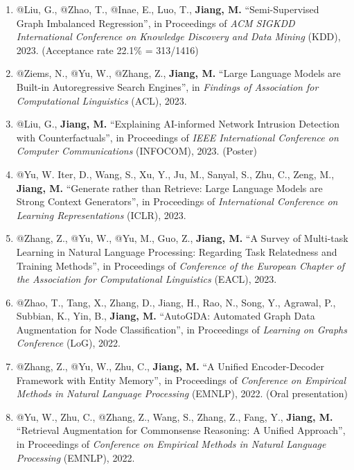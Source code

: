 \documentclass[10pt]{article}
\newenvironment{myindentpar}[1]%
{\begin{list}{}%
         {\setlength{\leftmargin}{#1}}%
         \item[]%
}
{\end{list}}
\newcounter{list}
\begin{document}
\begin{myindentpar}{0.00cm}
\begin{enumerate}[leftmargin=.5cm]
\item[C78] @Liu, G., @Zhao, T., @Inae, E., Luo, T., \textbf{Jiang, M.} ``Semi-Supervised Graph Imbalanced Regression'', in Proceedings of \textit{ACM SIGKDD International Conference on Knowledge Discovery and Data Mining} (KDD), 2023. (Acceptance rate 22.1\% = 313/1416)
		
\item[C77] @Ziems, N., @Yu, W., @Zhang, Z., \textbf{Jiang, M.} ``Large Language Models are Built-in Autoregressive Search Engines'', in \textit{Findings of Association for Computational Linguistics} (ACL), 2023.

\item[C76] @Liu, G., \textbf{Jiang, M.} ``Explaining AI-informed Network Intrusion Detection with Counterfactuals'', in Proceedings of \textit{IEEE International Conference on Computer Communications} (INFOCOM), 2023. (Poster)
		
\item[C75] @Yu, W. Iter, D., Wang, S., Xu, Y., Ju, M., Sanyal, S., Zhu, C., Zeng, M., \textbf{Jiang, M.} ``Generate rather than Retrieve: Large Language Models are Strong Context Generators'', in Proceedings of \textit{International Conference on Learning Representations} (ICLR), 2023.

\item[C74] @Zhang, Z., @Yu, W., @Yu, M., Guo, Z., \textbf{Jiang, M.} ``A Survey of Multi-task Learning in Natural Language Processing: Regarding Task Relatedness and Training Methods'', in Proceedings of \textit{Conference of the European Chapter of the Association for Computational Linguistics} (EACL), 2023.

\item[C73] @Zhao, T., Tang, X., Zhang, D., Jiang, H., Rao, N., Song, Y., Agrawal, P., Subbian, K., Yin, B., \textbf{Jiang, M.} ``AutoGDA: Automated Graph Data Augmentation for Node Classification'', in Proceedings of \textit{Learning on Graphs Conference} (LoG), 2022.

\item[C72] @Zhang, Z., @Yu, W., Zhu, C., \textbf{Jiang, M.} ``A Unified Encoder-Decoder Framework with Entity Memory'', in Proceedings of \textit{Conference on Empirical Methods in Natural Language Processing} (EMNLP), 2022. (Oral presentation)

\item[C71] @Yu, W., Zhu, C., @Zhang, Z., Wang, S., Zhang, Z., Fang, Y., \textbf{Jiang, M.} ``Retrieval Augmentation for Commonsense Reasoning: A Unified Approach'', in Proceedings of \textit{Conference on Empirical Methods in Natural Language Processing} (EMNLP), 2022.


\end{enumerate}
\end{myindentpar}
\end{document}
